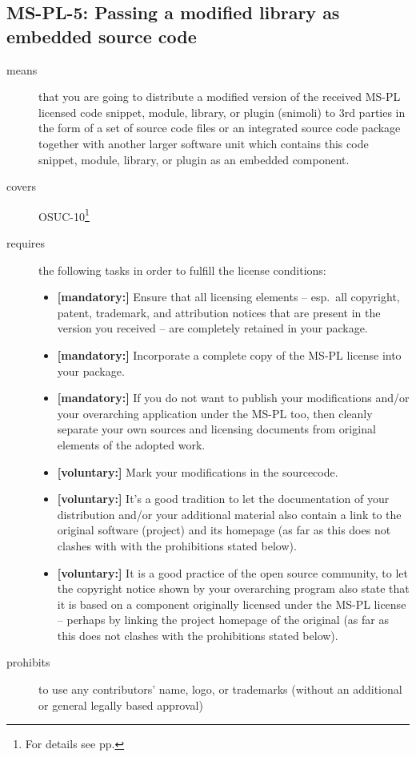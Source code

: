 \subsection{MS-PL-5: Passing a modified library as embedded source code}
\label{OSUC-10-MS-PL}
\begin{description}
\item[means] that you are going to distribute a modified version of the received
MS-PL licensed code snippet, module, library, or plugin (snimoli) to 3rd parties
in the form of a set of source code files or an integrated source code package
together with another larger software unit which contains this code snippet,
module, library, or plugin as an embedded component.

\item[covers] OSUC-10\footnote{For details see pp. \pageref{OSUC-10-DEF}}
\item[requires] the following tasks in order to fulfill the license conditions:
\begin{itemize}
 
 \item \textbf{[mandatory:]} Ensure that all licensing elements -- esp.\ all
  copyright, patent, trademark, and attribution notices that are present in the
  version you received -- are completely retained in your package.
 
  \item \textbf{[mandatory:]} Incorporate a complete copy of the MS-PL license
  into your package.
  
  \item \textbf{[mandatory:]} If you do not want to publish your modifications
  and/or your overarching application under the MS-PL too, then cleanly separate
  your own sources and licensing documents from original elements of the adopted
  work.
  
  \item \textbf{[voluntary:]} Mark your modifications in the sourcecode.
  
  \item \textbf{[voluntary:]} It's a good tradition to let the documentation of
  your distribution and/or your additional material also contain a link to the
  original software (project) and its homepage (as far as this does not clashes
  with with the prohibitions stated below).

  \item \textbf{[voluntary:]} It is a good practice of the open source
  community, to let the copyright notice shown by your overarching program also
  state that it is based on a component originally licensed under the MS-PL
  license -- perhaps by linking the project homepage of the original (as far as
  this does not clashes with the prohibitions stated below).
  
\end{itemize}

\item[prohibits] to use any contributors' name, logo, or trademarks (without an
additional or general legally based approval)

\end{description}

